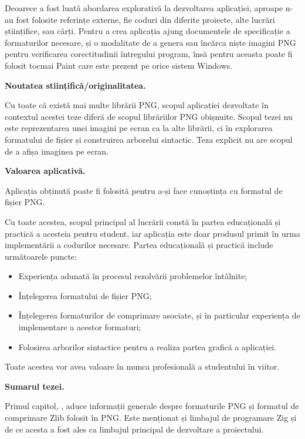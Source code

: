 \documentclass[a4paper,12pt]{report}
\begin{document}
Deoarece a fost luată abordarea explorativă la dezvoltarea aplicației,
aproape n-au fost folosite referințe externe,
fie coduri din diferite proiecte, alte lucrări științifice, sau cărți.
Pentru a crea aplicația ajung documentele de specificație a formaturilor necesare,
și o modalitate de a genera sau încărca niște imagini \ac{PNG}
pentru verificarea corectitudinii întregului program,
însă pentru aceasta poate fi folosit tocmai Paint care este prezent pe orice sistem Windows.

\textbf{Noutatea stiințifică/originalitatea.}

Cu toate că există mai multe librării \ac{PNG},
scopul aplicației dezvoltate în contextul acestei teze diferă de scopul librăriilor \ac{PNG} obișnuite.
Scopul tezei nu este reprezentarea unei imagini pe ecran ca la alte librării,
ci în explorarea formatului de fișier și construirea arborelui sintactic.
Teza explicit nu are scopul de a afișa imaginea pe ecran.

\textbf{Valoarea aplicativă.}

Aplicația obținută poate fi folosită pentru a-și face cunoștința cu formatul de fișier \acs{PNG}.

Cu toate acestea, scopul principal al lucrării constă
în partea educațională și practică a acesteia pentru student,
iar aplicația este doar produsul primit în urma implementării a codurilor necesare.
Partea educațională și practică include următoarele puncte:
\begin{itemize}
    \item Experiența adunată în procesul rezolvării problemelor întâlnite;
    \item Înțelegerea formatului de fișier \acs{PNG};
    \item
        Înțelegerea formaturilor de comprimare asociate,
        și în particular experiența de implementare a acestor formaturi;
    \item Folosirea arborilor sintactice pentru a realiza partea grafică a aplicației.
\end{itemize}

Toate acestea vor avea valoare în munca profesională a studentului în viitor.


\textbf{Sumarul tezei.}

Primul capitol, , aduce informații generale despre
formaturile \acs{PNG} și formatul de comprimare Zlib folosit în \acs{PNG}.
Este menționat și limbajul de programare Zig și de ce acesta a fost ales
ca limbajul principal de dezvoltare a proiectului.
\end{document}
